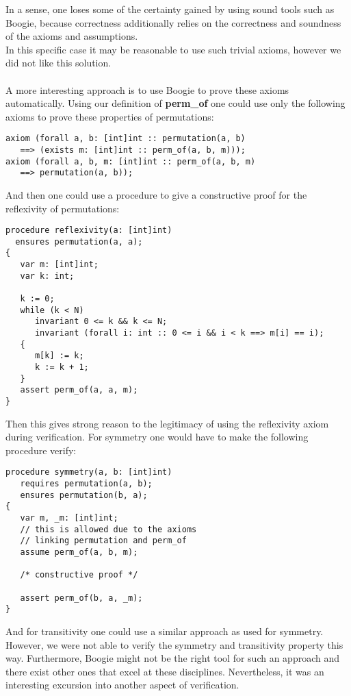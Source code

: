 \documentclass{report}
\begin{document}
In a sense, one loses some of the certainty gained by using sound tools such as
Boogie, because correctness additionally relies on the correctness and soundness
of the axioms and assumptions.\\
In this specific case it may be reasonable to use such trivial axioms, however we did not like this solution.
\\\\
A more
interesting approach is to use Boogie to prove these axioms automatically. Using our
definition of \textbf{perm\_of} one could use only the following axioms to
prove these properties of permutations:
\begin{lstlisting}
axiom (forall a, b: [int]int :: permutation(a, b)
   ==> (exists m: [int]int :: perm_of(a, b, m)));
axiom (forall a, b, m: [int]int :: perm_of(a, b, m)
   ==> permutation(a, b));
\end{lstlisting}
And then one could use a procedure to give a constructive proof for the
reflexivity of permutations:
\begin{lstlisting}
procedure reflexivity(a: [int]int)
  ensures permutation(a, a);
{
   var m: [int]int;
   var k: int;

   k := 0;
   while (k < N)
      invariant 0 <= k && k <= N;
      invariant (forall i: int :: 0 <= i && i < k ==> m[i] == i);
   {
      m[k] := k;
      k := k + 1;
   }
   assert perm_of(a, a, m);
}
\end{lstlisting}
Then this gives strong reason to the legitimacy of using the reflexivity axiom
during verification. For symmetry one would have to make the following procedure
verify:
\begin{lstlisting}
procedure symmetry(a, b: [int]int)
   requires permutation(a, b);
   ensures permutation(b, a);
{
   var m, _m: [int]int;
   // this is allowed due to the axioms
   // linking permutation and perm_of
   assume perm_of(a, b, m);
                 
   /* constructive proof */
                     
   assert perm_of(b, a, _m);
}
\end{lstlisting}
And for transitivity one could use a similar approach as used for symmetry.\\
However, we were not able to verify the symmetry and transitivity property this way.
Furthermore, Boogie might not be the right tool for such an approach and there exist other ones that excel at these disciplines.
Nevertheless, it was an interesting excursion into another aspect of verification.
\\
\end{document}
